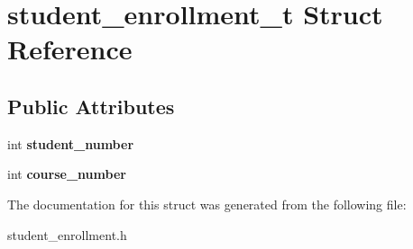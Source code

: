\hypertarget{structstudent__enrollment__t}{}\section{student\+\_\+enrollment\+\_\+t Struct Reference}
\label{structstudent__enrollment__t}
\subsection*{Public Attributes}
\begin{DoxyCompactItemize}
\item 
\mbox{\label{structstudent__enrollment__t_ac366d15c55e52bb89d75c695b056b63d}} 
int {\bfseries student\+\_\+number}
\item 
\mbox{\label{structstudent__enrollment__t_a903924209338ebd5d1fa9fdf9a119009}} 
int {\bfseries course\+\_\+number}
\end{DoxyCompactItemize}


The documentation for this struct was generated from the following file\+:\begin{DoxyCompactItemize}
\item 
student\+\_\+enrollment.\+h\end{DoxyCompactItemize}
